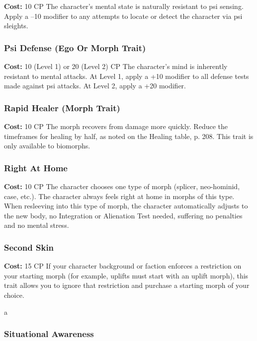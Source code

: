 \textbf{Cost:} 10 CP
The character's mental state is naturally resistant to 
psi sensing. Apply a –10 modifier to any attempts to 
locate or detect the character via psi sleights.

\subsubsection{Psi Defense (Ego Or Morph Trait)}

\textbf{Cost:} 10 (Level 1) or 20 (Level 2) CP
The character's mind is inherently resistant to 
mental attacks. At Level 1, apply a +10 modifier to 
all defense tests made against psi attacks. At Level 2, 
apply a +20 modifier.

\subsubsection{Rapid Healer (Morph Trait)}

\textbf{Cost:} 10 CP
The morph recovers from damage more quickly. 
Reduce the timeframes for healing by half, as noted 
on the Healing table, p. 208. This trait is only available
to biomorphs.

\subsubsection{Right At Home}

\textbf{Cost:} 10 CP
The character chooses one type of morph (splicer, 
neo-hominid, case, etc.). The character always 
feels right at home in morphs of this type. When 
resleeving into this type of morph, the character automatically
adjusts to the new body, no Integration
or Alienation Test needed, suffering no penalties and 
no mental stress.

\subsubsection{Second Skin}

\textbf{Cost:} 15 CP
If your character background or faction enforces a 
restriction on your starting morph (for example, uplifts
must start with an uplift morph), this trait allows
you to ignore that restriction and purchase a starting 
morph of your choice.

a

\subsubsection{Situational Awareness}

